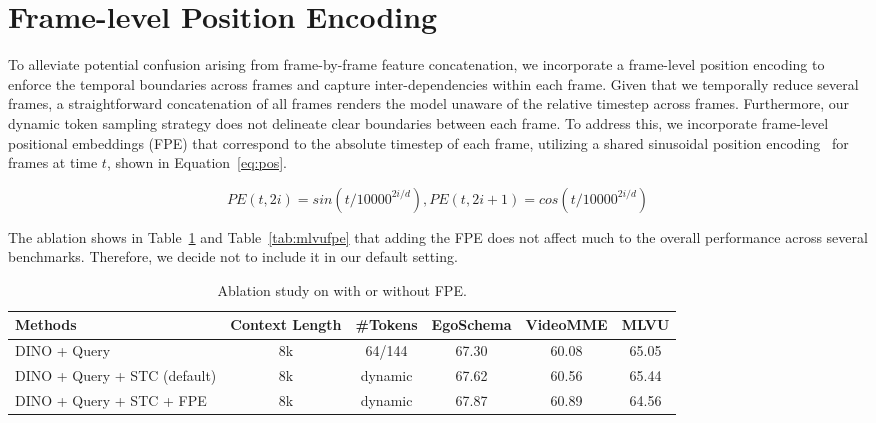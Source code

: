\section{Frame-level Position Encoding}
\label{sec:pos} 

To alleviate potential confusion arising from frame-by-frame feature concatenation, we incorporate a frame-level position encoding to enforce the temporal boundaries across frames and capture inter-dependencies within each frame. Given that we temporally reduce several frames, a straightforward concatenation of all frames renders the model unaware of the relative timestep across frames. Furthermore, our dynamic token sampling strategy does not delineate clear boundaries between each frame. To address this, we incorporate frame-level positional embeddings (FPE) that correspond to the absolute timestep of each frame, utilizing a shared sinusoidal position encoding~\citep{vaswani2017attention} for frames at time $t$, shown in Equation~\ref{eq:pos}.

\begin{equation}\label{eq:pos}
    PE(t,2i) = sin(t/10000^{2i/d}), 
    PE(t,2i+1) = cos(t/10000^{2i/d}) 
\end{equation}

The ablation shows in Table~\ref{tab:fpe} and Table~\ref{tab:mlvufpe} that adding the FPE does not affect much to the overall performance across several benchmarks. Therefore, we decide not to include it in our default setting.

\begin{table}[!htbp]
    \centering
\begin{adjustbox}{width=0.9\linewidth,center}
\renewcommand{\arraystretch}{1.2}
\setlength{\tabcolsep}{1.5mm}
\begin{tabular}{lccccc}
\toprule \textbf{Methods} & \textbf{Context Length} & \textbf{\#Tokens} & \multicolumn{1}{c}{ \textbf{EgoSchema} } & \multicolumn{1}{c}{ \textbf{VideoMME} } & \multicolumn{1}{c}{\textbf{MLVU}} \\
\midrule
DINO + Query & 8k & 64/144 & 67.30 & 60.08 & 65.05 \\
\rowcolor{blue!10} DINO + Query + STC (default) & 8k & dynamic & 67.62 & 60.56 & 65.44 \\
DINO + Query + STC + FPE & 8k & dynamic & 67.87 & 60.89 & 64.56 \\
\bottomrule
\end{tabular}
\end{adjustbox}
\caption{Ablation study on with or without FPE.}
\label{tab:fpe}
\end{table}

